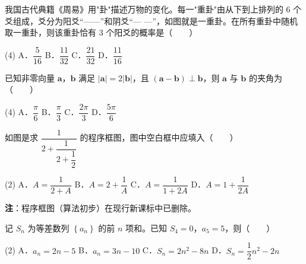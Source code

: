 \begin{question}
我国古代典籍《周易》用"卦"描述万物的变化。每一"重卦"由从下到上排列的 $6$ 个爻组成，爻分为阳爻“——”和阴爻“— —”，如图就是一重卦。在所有重卦中随机取一重卦，则该重卦恰有 $3$ 个阳爻的概率是\mbox{（　　）}
\nopagebreak[4]
\begin{center}\end{center}
\nopagebreak[4]
\begin{gkopts}(4)
\task A．$\dfrac5{16}$
\task B．$\dfrac{11}{32}$
\task C．$\dfrac{21}{32}$
\task D．$\dfrac{11}{16}$
\end{gkopts}

\end{question}
\begin{question}
已知非零向量 $\boldsymbol a$，$\boldsymbol b$ 满足 $|\boldsymbol a|=2|\boldsymbol b|$，且 $(\boldsymbol a-\boldsymbol b)\perp\boldsymbol b$，则 $\boldsymbol a$ 与 $\boldsymbol b$ 的夹角为\mbox{（　　）}

\begin{gkopts}(4)
\task A．$\dfrac\pi6$
\task B．$\dfrac\pi3$
\task C．$\dfrac{2\pi}3$
\task D．$\dfrac{5\pi}6$
\end{gkopts}

\Needspace{0.4\textheight}
\end{question}
\begin{question}
如图是求 $\dfrac1{2+\dfrac1{2+\dfrac12}}$ 的程序框图，图中空白框中应填入\mbox{（　　）}
\nopagebreak[4]
\begin{center}\end{center}
\nopagebreak[4]
\begin{gkopts}(2)
\task A．$A=\dfrac1{2+A}$
\task B．$A=2+\dfrac1A$
\task C．$A=\dfrac1{1+2A}$
\task D．$A=1+\dfrac1{2A}$
\end{gkopts}

\begin{gktip}
\textbf{注}：程序框图（算法初步）在现行新课标中已删除。
\end{gktip}

\end{question}
\begin{question}
记 $S_n$ 为等差数列 $\left\{a_n\right\}$ 的前 $n$ 项和。已知 $S_4=0$，$a_5=5$，则\mbox{（　　）}

\begin{gkopts}(2)
\task A．$a_n=2n-5$
\task B．$a_n=3n-10$
\task C．$S_n=2n^{2}-8n$
\task D．$S_n=\dfrac12n^{2}-2n$
\end{gkopts}

\end{question}
